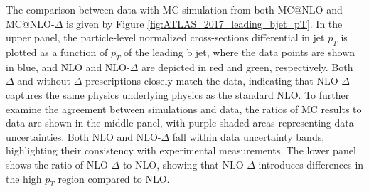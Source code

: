 \documentclass[NOTE, REPORT=true, atlasdraft=true, USenglish]{atlasdoc}
\begin{document}
The comparison between data with MC simulation from both MC@NLO and MC@NLO-$\Delta$ is given by Figure \ref{fig:ATLAS_2017_leading_bjet_pT}. In the upper panel, the particle-level normalized cross-sections differential in jet $p_T$ is plotted as a function of $p_T$ of the leading b jet, where the data points are shown in blue, and NLO and NLO-$\Delta$ are depicted in red and green, respectively. Both $\Delta$ and without $\Delta$ prescriptions closely match the data, indicating that NLO-$\Delta$ captures the same physics underlying physics as the standard NLO. To further examine the agreement between simulations and data, the ratios of MC results to data are shown in the middle panel, with purple shaded areas representing data uncertainties. Both NLO and NLO-$\Delta$ fall within data uncertainty bands, highlighting their consistency with experimental measurements. The lower panel shows the ratio of NLO-$\Delta$ to NLO, showing that NLO-$\Delta$ introduces differences in the high $p_T$ region compared to NLO.
\end{document}
